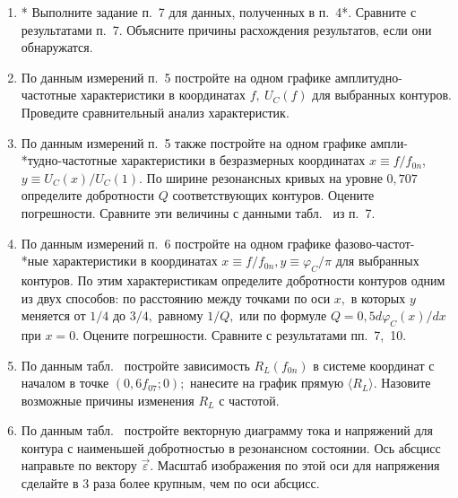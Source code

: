 \begin{lab:task}
\begin{enumerate}
		Представьте результат проделанных в работе  величин $L$ и $R_L$ в виде: $\langle L\rangle\pm\Delta L$ и $\langle R_L\rangle\pm\Delta R_L,$ где угловыми скобками отмечены средние значения, а символом $"\Delta"$~---~случайные погрешности величин $L$ и $R_L.$

		Оцените относительный вклад активных потерь в конденсаторах, представленных в табл.~ сопротивлением $R_{S~{max}},$ рассчитанным для максимального значения $\tg\delta=10^{-3},$ в суммарное активное сопротивление контура. Оцените влияние погрешностей приборов на результаты измерений.

    \item * Выполните задание п.~7 для данных, полученных в п.~4*. Сравните с результатами п.~7. Объясните причины расхождения результатов, если они обнаружатся.
    
    \item По данным измерений п.~5 постройте на одном графике амплитудно-частотные характеристики в координатах $ f,~U_C(f)$ для выбранных контуров. Проведите сравнительный анализ характеристик.
    
    \item По данным измерений п.~5 также постройте на одном графике ампли-\\*тудно-частотные характеристики в безразмерных координатах $x\equiv f/f_{0n}$, $y\equiv U_C(x)/U_C(1)$. По ширине резонансных кривых на уровне $0,707$ определите добротности $Q$ соответствующих контуров. Оцените погрешности. Сравните эти величины с данными табл.~ из п.~7.
    
    \item По данным измерений п.~6 постройте на одном графике фазово-частот-\\*ные характеристики в координатах $x\equiv f/f_{0n}, y\equiv\varphi_C/\pi$ для выбранных контуров. По этим характеристикам определите добротности контуров одним из двух способов: по расстоянию между точками по оси $x,$ в которых $y$ меняется от $1/4$ до $3/4,$ равному $1/Q,$ или по формуле $Q=0,5d\varphi_C(x)/dx$ при $x=0.$ Оцените погрешности. Сравните с результатами пп.~7,~10.
    
    \item По данным табл.~ постройте зависимость $R_L(f_{0n})$ в системе координат с началом в точке $(0,6f_{07};0);$ нанесите на график прямую $\langle R_L\rangle.$ Назовите возможные причины изменения $R_L$ с частотой.
    
    \item По данным табл.~ постройте векторную диаграмму тока и напряжений для контура с наименьшей добротностью в резонансном состоянии. Ось абсцисс направьте по вектору $\vec \varepsilon.$ Масштаб изображения по этой оси для напряжения сделайте в 3 раза более крупным, чем по оси абсцисс.
	\end{enumerate}
\end{lab:task}

